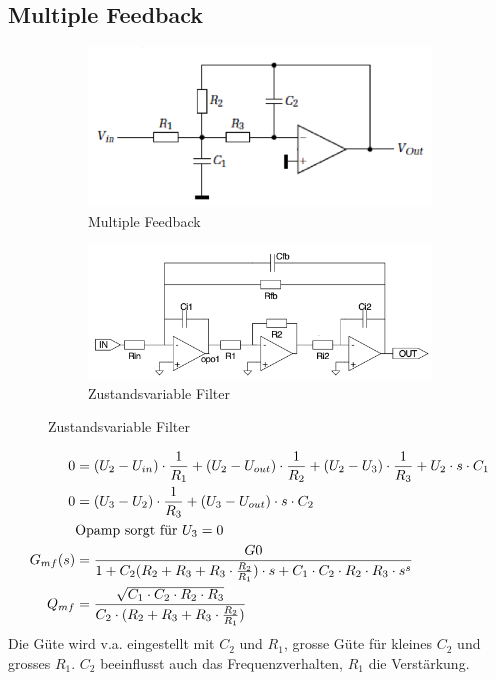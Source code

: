 \subsection{Multiple Feedback}
\begin{figure}[!h]
	\centering
	\begin{subfigure}[b]{0.45\textwidth}
		\includegraphics[scale=0.4]{./pictures/mulipleFeedback.png}
		\caption{Multiple Feedback}
	\end{subfigure}
	\begin{subfigure}[b]{0.45\textwidth}
		\includegraphics[scale=0.4]{./pictures/zustandsvariable.png}
		\caption{Zustandsvariable Filter}
	\end{subfigure}
\end{figure}
\begin{align*}
0			&=(U_2-U_{in})\cdot \frac{1}{R_1}+(U_2-U_{out})\cdot \frac{1}{R_2}+(U_2-U_3)\cdot \frac{1}{R_3}+U_2\cdot s\cdot C_1\\
0			&=(U_3-U_2)\cdot \frac{1}{R_3}+(U_3-U_{out})\cdot s\cdot C_2\\
			&\text{Opamp sorgt für }U_3=0\notag\\
G_{mf}(s)	&=\frac{G0}{1+C_2(R_2+R_3+R_3\cdot \frac{R_2}{R_1})\cdot s+C_1\cdot C_2\cdot R_2\cdot R_3\cdot s^s}\\
Q_{mf}		&=\frac{\sqrt{C_1\cdot C_2\cdot R_2\cdot R_3}}{C_2\cdot (R_2+R_3+R_3\cdot \frac{R_2}{R_1})}
\end{align*}
Die Güte wird v.a. eingestellt mit $C_2$ und $R_1$, grosse Güte für kleines
$C_2$ und grosses $R_1$. $C_2$ beeinflusst auch das Frequenzverhalten, $R_1$ die
Verstärkung.

